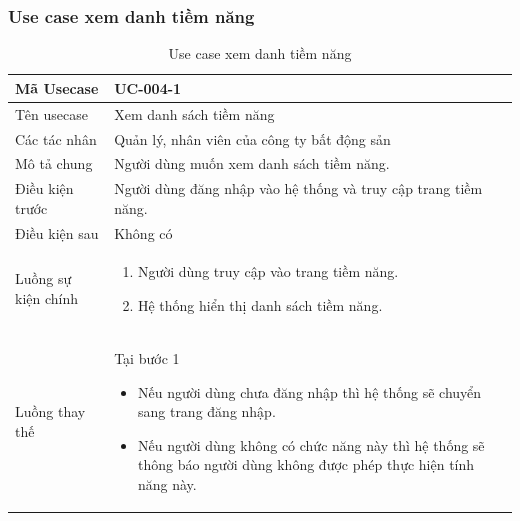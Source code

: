 \documentclass[12pt,a4paper]{article}
\begin{document}
    \subsubsection*{Use case xem danh tiềm năng }
    \begin{table}[H]
        \centering
        \begin{tabular}{|p{3.5cm}|p{11.5cm}|c|}
            \hline
            Mã Usecase      & UC-004-1                                                       \\
            \hline
            Tên usecase     & Xem danh sách tiềm năng                                        \\
            \hline
            Các tác nhân    & Quản lý, nhân viên của công ty bất động sản                    \\
            \hline
            Mô tả chung     & Người dùng muốn xem danh sách tiềm năng.                       \\
            \hline
            Điều kiện trước & Người dùng đăng nhập vào hệ thống và truy cập trang tiềm năng. \\
            \hline
            Điều kiện sau   & Không có                                                       \\
            \hline
            Luồng sự kiện chính & \vspace{-.8cm}\begin{enumerate}
                                                    \item Người dùng truy cập vào trang tiềm năng.
                                                    \item Hệ thống hiển thị danh sách tiềm năng.
            \end{enumerate}
            \\
            \hline
            Luồng thay thế & Tại bước 1\newline
            \vspace{-.8cm}\begin{itemize}
                              \item Nếu người dùng chưa đăng nhập thì hệ thống sẽ chuyển sang trang đăng nhập.
                              \item  Nếu người dùng không có chức năng này thì hệ thống sẽ thông báo người dùng không được phép thực hiện tính năng này.
            \end{itemize}

            \\    \hline
        \end{tabular}
        \caption{Use case xem danh tiềm năng }
    \end{table}
\end{document}
